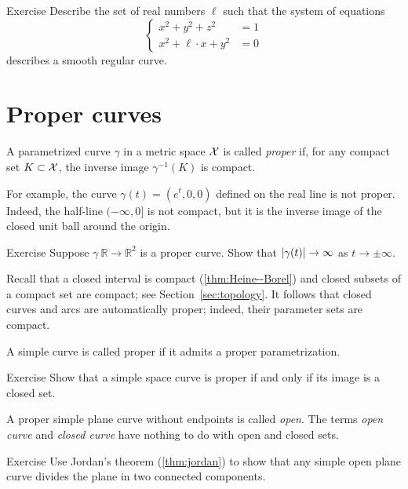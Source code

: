 \begin{thm}{Exercise}\label{ex:viviani}
Describe the set of real numbers $\ell$
such that the system of equations
\[\begin{cases}
x^2+y^2+z^2&=1
\\
x^2+\ell\cdot x+y^2&=0
\end{cases}\]
describes a smooth regular curve.
\end{thm}

\section{Proper curves}\label{sec:proper-curves}

A parametrized curve $\gamma$ in a metric space $\mathcal{X}$ is called \emph{proper} if, for any compact set $K \subset \mathcal{X}$, the inverse image $\gamma^{-1}(K)$ is compact.

For example, the curve $\gamma(t)=(e^t,0,0)$ defined on the real line is not proper.
Indeed, the half-line $(-\infty,0]$ is not compact, but it is the inverse image of the closed unit ball around the origin.

\begin{thm}{Exercise}\label{ex:open-curve}
Suppose $\gamma\:\mathbb{R}\to\mathbb{R}^2$ is a proper curve.
Show that  $|\gamma(t)|\z\to\infty$ as $t\to\pm\infty$.
\end{thm}


Recall that a closed interval is compact (\ref{thm:Heine--Borel}) and closed subsets of a compact set are compact;
see Section~\ref{sec:topology}.
It follows that closed curves and arcs are automatically proper;
indeed, their parameter sets are compact.

A simple curve is called proper if it admits a proper parametrization.

\begin{thm}{Exercise}\label{ex:proper-closed}
Show that a simple space curve is proper if and only if its image is a closed set.

\end{thm}

A proper simple plane curve without endpoints is called \emph{open}.
The terms {}\emph{open curve} and {}\emph{closed curve} have nothing to do with open and closed sets.

\begin{thm}{Exercise}\label{ex:proper-curve}
Use Jordan's theorem (\ref{thm:jordan}) to show that any simple open plane curve divides the plane in two connected components.  
\end{thm}



